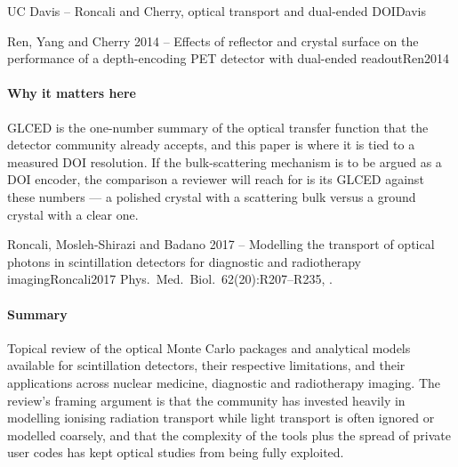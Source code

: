 \begin{programnote}{UC Davis -- Roncali and Cherry, optical transport and dual-ended DOI}{Davis}
\begin{papernote}{Ren, Yang and Cherry 2014 -- Effects of reflector and crystal surface on the performance of a depth-encoding PET detector with dual-ended readout}{Ren2014}
\paragraph{Why it matters here}
GLCED is the one-number summary of the optical transfer function that the
detector community already accepts, and this paper is where it is tied to a
measured DOI resolution. If the bulk-scattering mechanism is to be argued as a
DOI encoder, the comparison a reviewer will reach for is its GLCED against
these numbers --- a polished crystal with a scattering bulk versus a ground
crystal with a clear one.

\end{papernote}

\begin{papernote}{Roncali, Mosleh-Shirazi and Badano 2017 -- Modelling the transport of optical photons in scintillation detectors for diagnostic and radiotherapy imaging}{Roncali2017}
Phys.\ Med.\ Biol.\ 62(20):R207--R235, .

\paragraph{Summary}
Topical review of the optical Monte Carlo packages and analytical models
available for scintillation detectors, their respective limitations, and their
applications across nuclear medicine, diagnostic and radiotherapy imaging. The
review's framing argument is that the community has invested heavily in
modelling ionising radiation transport while light transport is often ignored
or modelled coarsely, and that the complexity of the tools plus the spread of
private user codes has kept optical studies from being fully exploited.


\end{papernote}
\end{programnote}
